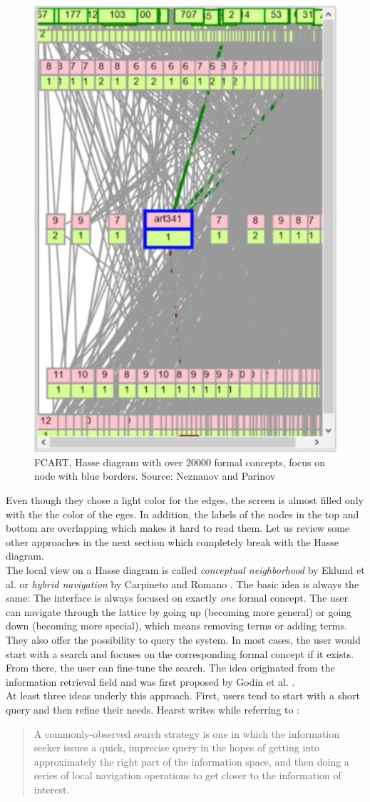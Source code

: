 \documentclass[11pt]{report}
\begin{document}
\begin{figure}[!ht]
	\centering
	\includegraphics[width=0.5\linewidth]{./images/fcart}
\caption{FCART, Hasse diagram with over 20000 formal concepts, focus on node with blue borders. Source: Neznanov and Parinov \cite{Neznanov2014}}
\label{figure:fcart}
\end{figure}

Even though they chose a light color for the edges, the screen is almost filled only with the the color of the eges. In addition, the labels of the nodes in the top and bottom are overlapping which makes it hard to read them. Let us review some other approaches in the next section which completely break with the Hasse diagram. \\

The local view on a Hasse diagram is called \textit{conceptual neighborhood} by Eklund et al. \cite{Eklund2009,Eklund2012} or \textit{hybrid navigation} by Carpineto and Romano \cite{Carpineto1996}. The basic idea is always the same: The interface is always focused on exactly \textit{one} formal concept. The user can navigate through the lattice by going up (becoming more general) or going down (becoming more special), which means removing terms or adding terms. They also offer the possibility to query the system. In most cases, the user would start with a search and focuses on the corresponding formal concept if it exists. From there, the user can fine-tune the search. The idea originated from the information retrieval field and was first proposed by Godin et al. \cite{Godin1989}. \\

At least three ideas underly this approach. First, users tend to start with a short query and then refine their needs. Hearst \cite{Hearst2009} writes while referring to \cite{Marchionini2006,Bates1990}:
\begin{quote}
	A commonly-observed search strategy is one in which the information seeker issues a quick, imprecise query in the hopes of getting into approximately the right part of the information space, and then doing a series of local navigation operations to get closer to the information of interest.
\end{quote}
\end{document}
